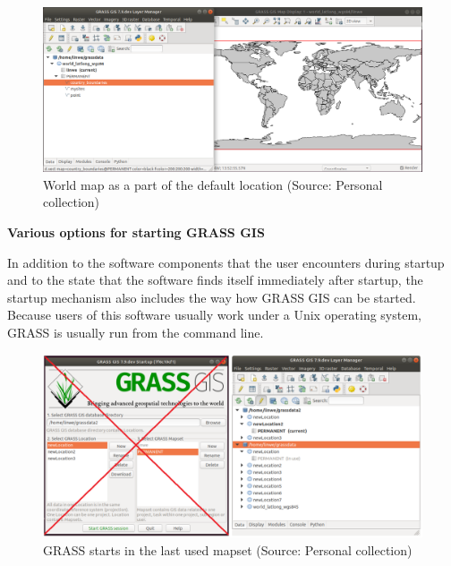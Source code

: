 \documentclass[a4paper,10pt,twoside]{article}
\begin{document}
\vspace{0.3cm}
\begin{figure}[hbt!] 
\begin{center}
\includegraphics[width=17cm]{../pictures/demolocation.png} 
\caption[World map as a part of the default location]{World map as a part of the default location (Source: Personal collection)}
\label{fig:demolocation}
\end{center}
\end{figure}

\noindent \textbf {Various options for starting GRASS GIS}

\large \noindent In addition to the software components that the user
encounters during startup and to the state that the software finds
itself immediately after startup, the startup mechanism also includes
the way how GRASS GIS can be started. Because users of this software usually
work under a Unix operating system, GRASS is usually run from the
command line. 

\vspace{0.3cm}
\begin{figure}[hbt!] 
\begin{center}
\includegraphics[width=17cm]{../pictures/last_mapset_startup.png} 
\caption[GRASS starts in the last used mapset]{GRASS starts in the last used mapset (Source: Personal collection)}
\label{fig:last_mapset_startup}
\end{center}
\end{figure}
\end{document}
